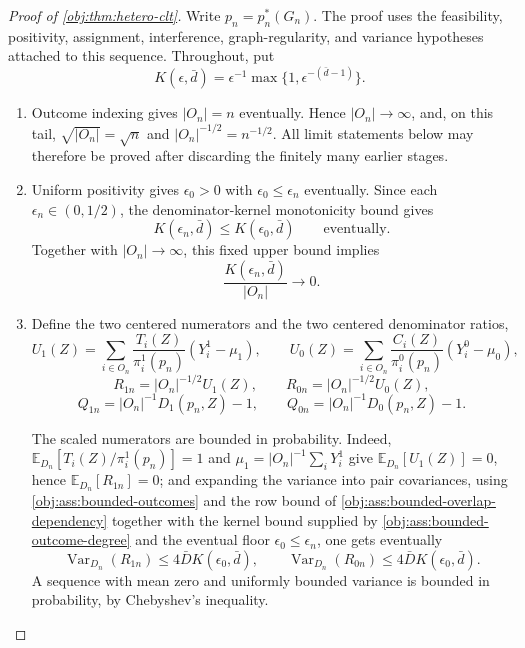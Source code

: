 \documentclass[11pt]{article}
\begin{document}
\begin{proof}[Proof of \cref{obj:thm:hetero-clt}]
Write \(p_n=p_n^*(G_n)\).  The proof uses the feasibility, positivity, assignment, interference, graph-regularity, and variance hypotheses attached to this sequence.  Throughout, put
\[
K(\epsilon,\bar d)=\epsilon^{-1}\max\{1,\epsilon^{-(\bar d-1)}\}.
\]

\begin{enumerate}
\item Outcome indexing gives \(|O_n|=n\) eventually.  Hence \(|O_n|\to\infty\), and, on this tail, \(\sqrt{|O_n|}=\sqrt n\) and \(|O_n|^{-1/2}=n^{-1/2}\).  All limit statements below may therefore be proved after discarding the finitely many earlier stages.

\item Uniform positivity gives \(\epsilon_0>0\) with \(\epsilon_0\le\epsilon_n\) eventually.  Since each \(\epsilon_n\in(0,1/2)\), the denominator-kernel monotonicity bound gives
\[
K(\epsilon_n,\bar d)\le K(\epsilon_0,\bar d)
\qquad\text{eventually.}
\]
Together with \(|O_n|\to\infty\), this fixed upper bound implies
\[
\frac{K(\epsilon_n,\bar d)}{|O_n|}\longrightarrow0.
\]

\item Define the two centered numerators and the two centered denominator ratios,
\[
U_1(Z)=\sum_{i\in O_n}\frac{T_i(Z)}{\pi_i^1(p_n)}\left(Y_i^1-\mu_1\right),
\qquad
U_0(Z)=\sum_{i\in O_n}\frac{C_i(Z)}{\pi_i^0(p_n)}\left(Y_i^0-\mu_0\right),
\]
\[
R_{1n}=|O_n|^{-1/2}U_1(Z),\qquad
R_{0n}=|O_n|^{-1/2}U_0(Z),
\]
\[
Q_{1n}=|O_n|^{-1}D_1(p_n,Z)-1,\qquad
Q_{0n}=|O_n|^{-1}D_0(p_n,Z)-1.
\]

The scaled numerators are bounded in probability.  Indeed, \(\mathbb E_{D_n}[T_i(Z)/\pi_i^1(p_n)]=1\) and \(\mu_1=|O_n|^{-1}\sum_iY_i^1\) give \(\mathbb E_{D_n}[U_1(Z)]=0\), hence \(\mathbb E_{D_n}[R_{1n}]=0\); and expanding the variance into pair covariances, using \cref{obj:ass:bounded-outcomes} and the row bound of \cref{obj:ass:bounded-overlap-dependency} together with the kernel bound supplied by \cref{obj:ass:bounded-outcome-degree} and the eventual floor \(\epsilon_0\le\epsilon_n\), one gets eventually
\[
\operatorname{Var}_{D_n}(R_{1n})\le 4\bar D K(\epsilon_0,\bar d),
\qquad
\operatorname{Var}_{D_n}(R_{0n})\le 4\bar D K(\epsilon_0,\bar d).
\]
A sequence with mean zero and uniformly bounded variance is bounded in probability, by Chebyshev's inequality.


\end{enumerate}
\end{proof}
\end{document}
